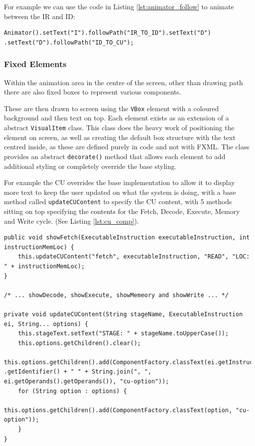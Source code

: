 For example we can use the code in Listing \ref{lst:animator_follow} to animate between the \ac{IR} and \ac{ID}:
\begin{lstlisting}[caption=Example of animating with the Animator, label=lst:animator_follow]
Animator().setText("I").followPath("IR_TO_ID").setText("D") .setText("D").followPath("ID_TO_CU");
\end{lstlisting}

\subsubsection{Fixed Elements}
Within the animation area in the centre of the screen, other than drawing path there are also fixed boxes to represent various components. 

These are then drawn to screen using the \texttt{VBox} element with a coloured background and then text on top. Each element exists as an extension of a abstract \texttt{VisualItem} class. This class does the heavy work of positioning the element on screen, as well as creating the default box structure with the text centred inside, as these are defined purely in code  and not with FXML. The class provides an abstract \verb|decorate()| method that allows each element to add additional styling or completely override the base styling.

For example the \ac{CU} overrides the base implementation to allow it to display more text to keep the user updated on what the system is doing, with a base method called \verb|updateCUContent| to specify the \ac{CU} content, with 5 methods sitting on top specifying the contents for the Fetch, Decode, Execute, Memory and Write cycle. (See Listing \ref{lst:cu_comp}).

\begin{lstlisting}[caption={\ac{CU} content updater methods}, label={lst:cu_comp}]
public void showFetch(ExecutableInstruction executableInstruction, int instructionMemLoc) {
    this.updateCUContent("fetch", executableInstruction, "READ", "LOC: " + instructionMemLoc);
}

/* ... showDecode, showExecute, showMemeory and showWrite ... */

private void updateCUContent(String stageName, ExecutableInstruction ei, String... options) {
    this.stageText.setText("STAGE: " + stageName.toUpperCase());
    this.options.getChildren().clear();
    this.options.getChildren().add(ComponentFactory.classText(ei.getInstruction() .getIdentifier() + " " + String.join(", ", ei.getOperands().getOperands()), "cu-option"));
    for (String option : options) {
        this.options.getChildren().add(ComponentFactory.classText(option, "cu-option"));
    }
}
\end{lstlisting}

